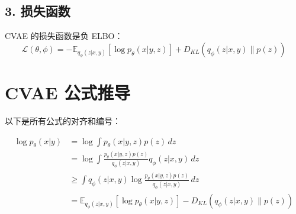 \documentclass{article}
\begin{document}
\subsection*{3. 损失函数}
CVAE 的损失函数是负 ELBO：
\[
  \mathcal{L}(\theta, \phi) = -\mathbb{E}_{q_\phi(z|x, y)} \left[ \log p_\theta(x|y, z) \right] + D_{KL}(q_\phi(z|x, y) \| p(z))
\]

\section*{CVAE 公式推导}

以下是所有公式的对齐和编号：

\begin{align}
  \log p_\theta(x|y) & = \log \int p_\theta(x|y, z) p(z) \, dz \tag{1}                                                             \\
                     & = \log \int \frac{p_\theta(x|y, z) p(z)}{q_\phi(z|x, y)} q_\phi(z|x, y) \, dz \tag{2}                       \\
                     & \geq \int q_\phi(z|x, y) \log \frac{p_\theta(x|y, z) p(z)}{q_\phi(z|x, y)} \, dz \tag{3}                    \\
                     & = \mathbb{E}_{q_\phi(z|x, y)} \left[ \log p_\theta(x|y, z) \right] - D_{KL}(q_\phi(z|x, y) \| p(z)) \tag{4}
\end{align}
\end{document}
